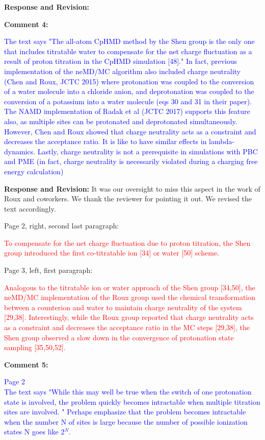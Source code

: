 \documentclass[11pt,letterpaper]{businessletter}
\begin{document}
\begin{letter}
\textbf{Response and Revision:} 

\textbf{Comment 4:}

\textcolor{Blue}{
The text says "The all-atom CpHMD method by the Shen group is the only one that includes titratable water to compensate for the net charge fluctuation as a result of proton titration in the CpHMD simulation [48]." In fact, previous implementation of the neMD/MC algorithm also included charge neutrality (Chen and Roux, JCTC 2015) where protonation was coupled to the conversion of a water molecule into a chloride anion, and deprotonation was coupled to the conversion of a potassium into a water molecule (eqs 30 and 31 in their paper). The NAMD implementation of Radak et al (JCTC 2017) supports this feature also, as multiple sites can be protonated and deprotonated simultaneously. However, Chen and Roux showed that charge neutrality acts as a constraint and decreases the acceptance ratio. It is like to have similar effects in lambda-dynamics. Lastly, charge neutrality is not a prerequisite in simulations with PBC and PME (in fact, charge neutrality is necessarily violated during a charging free energy calculation)
}

\textbf{Response and Revision:} 
It was our oversight to miss this aspect in the work of Roux and coworkers.  
We thank the reviewer for pointing it out. 
We revised the text accordingly.

Page 2, right, second last paragraph:

\textcolor{red}{
To compensate for the net charge fluctuation due to proton titration, the Shen group introduced the first
co-titratable ion [34] or water [50] scheme.
}

Page 3, left, first paragraph:

\textcolor{red}{
Analogous to the titratable ion or water approach of the Shen group [34,50], the neMD/MC implementation of the Roux group used the chemical transformation 
between a counterion and water to maintain charge neutrality of the system [29,38].
Interestingly, while the Roux group reported that charge neutrality 
acts as a constraint and decreases the acceptance ratio in the MC steps [29,38], 
the Shen group observed a slow down in the convergence of protonation state sampling [35,50,52].
}

\textbf{Comment 5:}

\textcolor{Blue}{
Page 2 \\
The text says "While this may well be true when the switch of one protonation state is involved, the problem quickly becomes intractable when multiple titration sites are involved. " Perhaps emphasize that the problem becomes intractable when the number N of sites is large because the number of possible ionization states N goes like 2$^N$.
}



\end{letter}
\end{document}
